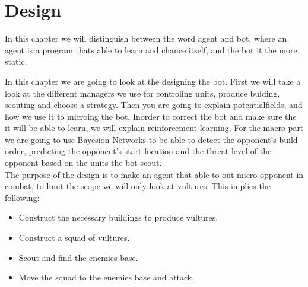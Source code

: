 \chapter{Design}\label{design}
	In this chapter we will distinguish between the word agent and bot, where an agent is a program thats able to learn and chance itself, and the bot it the more static.
	
	In this chapter we are going to look at the designing the bot. First we will take a look at the different managers we use for controling units, produce bulding, scouting and choose a strategy. Then you are going to explain potentialfields, and how we use it to microing the bot. Inorder to correct the bot and make sure the it will be able to learn, we will explain reinforcement learning. For the macro part we are going to use Bayesion Networks to be able to detect the opponent's build order, predicting the opponent's start location and the threat level of the opponent based on the units the bot scout.	\\
	The purpose of the design is to make an agent that able to out micro opponent in combat, to limit the scope we will only look at vultures. 
	This implies the following:
	\begin{itemize}
		\item Construct the necessary buildings to produce vultures.
		\item Construct a squad of vultures.
		\item Scout and find the enemies base.
		\item Move the squad to the enemies base and attack.
	\end{itemize}
	
	
	
	
	
	
	
	
